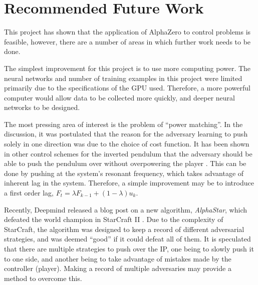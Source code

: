 \documentclass[../main.tex]{subfiles}
\begin{document}
\section{Recommended Future Work}

This project has shown that the application of AlphaZero to control problems is feasible, however, there are a number of areas in which further work needs to be done.

The simplest improvement for this project is to use more computing power. The neural networks and number of training examples in this project were limited primarily due to the specifications of the GPU used. Therefore, a more powerful computer would allow data to be collected more quickly, and deeper neural networks to be designed.

The most pressing area of interest is the problem of ``power matching''. In the discussion, it was postulated that the reason for the adversary learning to push solely in one direction was due to the choice of cost function. It has been shown in other control schemes for the inverted pendulum that the adversary should be able to push the pendulum over without overpowering the player \cite{invpen}. This can be done by pushing at the system's resonant frequency, which takes advantage of inherent lag in the system. Therefore, a simple improvement may be to introduce a first order lag, $F_t = \lambda F_{k-1} + (1-\lambda)u_k$.

Recently, Deepmind released a blog post on a new algorithm, \textit{AlphaStar}, which defeated the world champion in StarCraft II \cite{alphastar}. Due to the complexity of StarCraft, the algorithm was designed to keep a record of different adversarial strategies, and was deemed ``good'' if it could defeat all of them. It is speculated that there are multiple strategies to push over the IP, one being to slowly push it to one side, and another being to take advantage of mistakes made by the controller (player). Making a record of multiple adversaries may provide a method to overcome this.

\onlyinsubfile{}
\onlyinsubfile{\appendix}
\onlyinsubfile{}
\end{document}
